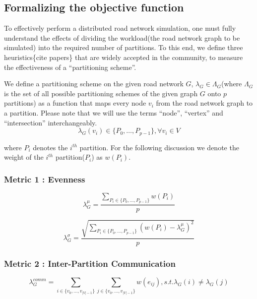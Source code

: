 \subsection{Formalizing the objective function}
\label{sec:form-obje-func}

To effectively perform a distributed road network simulation, one must fully understand the effects of dividing the workload(the road network graph to be simulated) into the required number of partitions. To this end, we define three heuristics\{cite papers\} that are widely accepted in the community, to measure the effectiveness of a ``partitioning scheme''. 

We define a partitioning scheme on the given road network $G$, $\lambda_G \in \Lambda_G$(where $\Lambda_G$ is the set of all possible partitioning schemes of the given graph $G$ onto $p$ partitions) as a function that maps every node $v_i$ from the road network graph to a partition. Please note that we will use the terms ``node'', ``vertex'' and ``intersection'' interchangeably.
\begin{equation}
\label{eq:part-sche}
\lambda_G(v_i) \in \{P_0,\dots,P_{p-1}\}, \forall v_i \in V
\end{equation}

\noindent where $P_i$ denotes the $i^{th}$ partition. For the following discussion we denote the weight of the $i^{th}$ partition($P_i$) as $w(P_i)$.

\subsubsection{Metric 1 : Evenness}

\begin{equation}
\label{eq:metric1-mean}
\lambda_G^\mu = \frac{\sum\limits_{P_i \in \{P_0,\dots,P_{p-1}\}} w(P_i)}{p}
\end{equation}

\begin{equation}
\label{eq:metric1}
\lambda_G^\sigma = \frac{\sqrt{\sum\limits_{P_i \in \{P_0,\dots,P_{p-1}\}} (w(P_i) - \lambda_G^\mu)^2}}{p}
\end{equation}



\subsubsection{Metric 2 : Inter-Partition Communication}
\begin{equation}
\label{eq:metric2}
\lambda_G^{comm} = \sum\limits_{i \in \{v_0,\dots,v_{|V|-1}\}}{\sum\limits_{j \in \{v_0,\dots,v_{|V|-1}\}}{w(e_{ij})}} , s.t. \lambda_G(i) \neq \lambda_G(j)
\end{equation}

